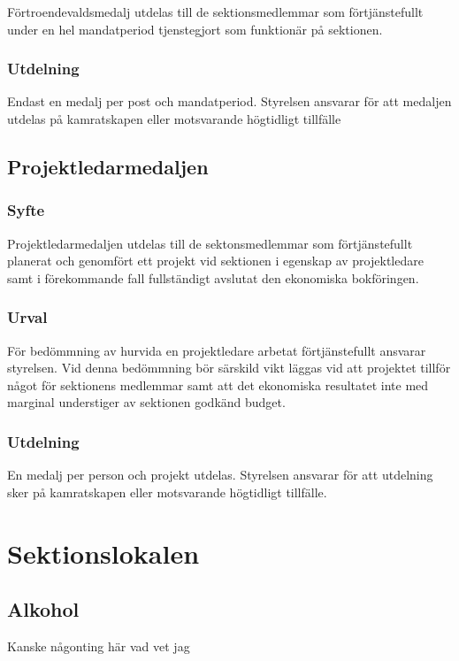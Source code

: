 \documentclass{../resources/dgovdoc}
\begin{document}
Förtroendevaldsmedalj utdelas till de sektionsmedlemmar som förtjänstefullt under en hel mandatperiod tjenstegjort som funktionär på sektionen. 

\subsubsection{Utdelning}

Endast en medalj per post och mandatperiod. Styrelsen ansvarar för att medaljen utdelas på kamratskapen eller motsvarande högtidligt tillfälle

\subsection{Projektledarmedaljen}

\subsubsection{Syfte}

Projektledarmedaljen utdelas till de sektonsmedlemmar som förtjänstefullt planerat och genomfört ett projekt vid sektionen i egenskap av projektledare samt i förekommande fall fullständigt avslutat den ekonomiska bokföringen. 

\subsubsection{Urval}

För bedömmning av hurvida en projektledare arbetat förtjänstefullt ansvarar styrelsen. Vid denna bedömmning bör särskild vikt läggas vid att projektet tillför något för sektionens medlemmar samt att det ekonomiska resultatet inte med marginal understiger av sektionen godkänd budget. 

\subsubsection{Utdelning}

En medalj per person och projekt utdelas. Styrelsen ansvarar för att utdelning sker på kamratskapen eller motsvarande högtidligt tillfälle.

\section{Sektionslokalen}

\subsection{Alkohol}
Kanske någonting här vad vet jag
\end{document}
